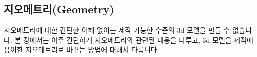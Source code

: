 % 
%
%

\begin{partbacktext}
\part{지오메트리(Geometry)}
\noindent 지오메트리에 대한 간단한 이해 없이는 제작 가능한 수준의 3d 모델을 만들 수 없습니다. 본 장에서는 아주 간단하게 지오메트리와 관련된 내용을 다루고, 3d 모델을 제작에 용이한 지오메트리로 바꾸는 방법에 대해서 다룹니다.

\end{partbacktext}